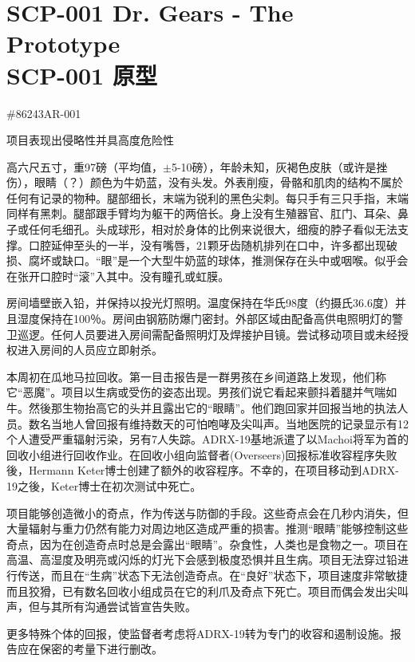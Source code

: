 \chapter[SCP-001 原型]{
	SCP-001 Dr. Gears - The Prototype \\
	SCP-001 原型
}

\label{chap:SCP-001.the.prototype}

\#86243AR-001

项目表现出侵略性并具高度危险性


高六尺五寸，重97磅（平均值，$\pm$5-10磅），年龄未知，灰褐色皮肤（或许是挫伤），眼睛（？）颜色为牛奶蓝，没有头发。外表削瘦，骨骼和肌肉的结构不属於任何有记录的物种。腿部细长，末端为锐利的黑色尖刺。每只手有三只手指，末端同样有黑刺。腿部跟手臂均为躯干的两倍长。身上没有生殖器官、肛门、耳朵、鼻子或任何毛细孔。头成球形，相对於身体的比例来说很大，细瘦的脖子看似无法支撑。口腔延伸至头的一半，没有嘴唇，21颗牙齿随机排列在口中，许多都出现破损、腐坏或缺口。“眼”是一个大型牛奶蓝的球体，推测保存在头中或咽喉。似乎会在张开口腔时“滚”入其中。没有瞳孔或虹膜。


房间墙壁嵌入铅，并保持以投光灯照明。温度保持在华氏98度（约摄氏36.6度）并且湿度保持在100％。房间由钢筋防爆门密封。外部区域由配备高供电照明灯的警卫巡逻。任何人员要进入房间需配备照明灯及焊接护目镜。尝试移动项目或未经授权进入房间的人员应立即射杀。


本周初在瓜地马拉回收。第一目击报告是一群男孩在乡间道路上发现，他们称它“恶魔”。项目以生病或受伤的姿态出现。男孩们说它看起来颤抖着腿并气喘如牛。然後那生物抬高它的头并且露出它的“眼睛”。他们跑回家并回报当地的执法人员。数名当地人曾回报有维持数天的可怕咆哮及尖叫声。当地医院的记录显示有12个人遭受严重辐射污染，另有7人失踪。ADRX-19基地派遣了以Machoi将军为首的回收小组进行回收作业。在回收小组向监督者(Overseers)回报标准收容程序失败後，Hermann Keter博士创建了额外的收容程序。不幸的，在项目移动到ADRX-19之後，Keter博士在初次测试中死亡。

项目能够创造微小的奇点，作为传送与防御的手段。这些奇点会在几秒内消失，但大量辐射与重力仍然有能力对周边地区造成严重的损害。推测“眼睛”能够控制这些奇点，因为在创造奇点时总是会露出“眼睛”。杂食性，人类也是食物之一。项目在高温、高湿度及明亮或闪烁的灯光下会感到极度恐惧并且生病。项目无法穿过铅进行传送，而且在“生病”状态下无法创造奇点。在“良好”状态下，项目速度非常敏捷而且狡猾，已有数名回收小组成员在它的利爪及奇点下死亡。项目而偶会发出尖叫声，但与其所有沟通尝试皆宣告失败。

更多特殊个体的回报，使监督者考虑将ADRX-19转为专门的收容和遏制设施。报告应在保密的考量下进行删改。
